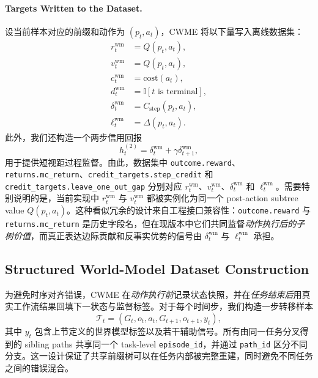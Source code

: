 \paragraph{Targets Written to the Dataset.}
设当前样本对应的前缀和动作为 $(p_t,a_t)$，CWME 将以下量写入离线数据集：
\begin{align}
    r_t^{\text{wm}} &= Q(p_t,a_t),\\
    v_t^{\text{wm}} &= Q(p_t,a_t),\\
    c_t^{\text{wm}} &= \text{cost}(a_t),\\
    d_t^{\text{wm}} &= \mathbb{I}[t \text{ is terminal}],\\
    \delta_t^{\text{wm}} &= C_{\text{step}}(p_t,a_t),\\
    \ell_t^{\text{wm}} &= \Delta(p_t,a_t).
\end{align}
此外，我们还构造一个两步信用回报
\begin{equation}
    h_t^{(2)} = \delta_t^{\text{wm}} + \gamma \delta_{t+1}^{\text{wm}},
\end{equation}
用于提供短视距过程监督。由此，数据集中 \texttt{outcome.reward}、\texttt{returns.mc\_return}、\texttt{credit\_targets.step\_credit} 和 \texttt{credit\_targets.leave\_one\_out\_gap} 分别对应 $r_t^{\text{wm}}$、$v_t^{\text{wm}}$、$\delta_t^{\text{wm}}$ 和 $\ell_t^{\text{wm}}$。需要特别说明的是，当前实现中 $r_t^{\text{wm}}$ 与 $v_t^{\text{wm}}$ 都被实例化为同一个 post-action subtree value $Q(p_t,a_t)$。这种看似冗余的设计来自工程接口兼容性：\texttt{outcome.reward} 与 \texttt{returns.mc\_return} 是历史字段名，但在现版本中它们共同监督\emph{动作执行后的子树价值}，而真正表达边际贡献和反事实优势的信号由 $\delta_t^{\text{wm}}$ 与 $\ell_t^{\text{wm}}$ 承担。

\subsection{Structured World-Model Dataset Construction}

为避免时序对齐错误，CWME 在\emph{动作执行前}记录状态快照，并在\emph{任务结束后}用真实工作流结果回填下一状态与监督标签。对于每个时间步，我们构造一步转移样本
\begin{equation}
    \mathcal{T}_t = \left(G_t, o_t, a_t, G_{t+1}, o_{t+1}, y_t\right),
\end{equation}
其中 $y_t$ 包含上节定义的世界模型标签以及若干辅助信号。所有由同一任务分叉得到的 sibling paths 共享同一个 task-level \texttt{episode\_id}，并通过 \texttt{path\_id} 区分不同分支。这一设计保证了共享前缀树可以在任务内部被完整重建，同时避免不同任务之间的错误混合。

